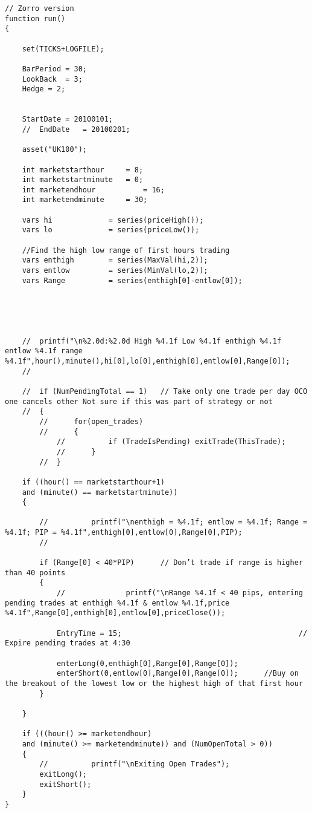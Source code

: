 \begin{lstlisting}[caption=First Hour Breakout System]
// Zorro version
function run()
{
	
	set(TICKS+LOGFILE);
	
	BarPeriod = 30;
	LookBack  = 3;
	Hedge = 2;
	
	
	StartDate = 20100101;
	//	EndDate   = 20100201;
	
	asset("UK100");
	
	int marketstarthour		= 8;
	int marketstartminute	= 0;
	int marketendhour			= 16;
	int marketendminute		= 30;
	
	vars hi				= series(priceHigh());
	vars lo				= series(priceLow());
	
	//Find the high low range of first hours trading
	vars enthigh		= series(MaxVal(hi,2)); 
	vars entlow 		= series(MinVal(lo,2));
	vars Range			= series(enthigh[0]-entlow[0]);
	
	
	
	
	
	//	printf("\n%2.0d:%2.0d High %4.1f Low %4.1f enthigh %4.1f entlow %4.1f range %4.1f",hour(),minute(),hi[0],lo[0],enthigh[0],entlow[0],Range[0]);
	//	
	
	//	if (NumPendingTotal == 1)   // Take only one trade per day OCO one cancels other Not sure if this was part of strategy or not
	//	{
		//		for(open_trades)
		//		{
			//			if (TradeIsPending) exitTrade(ThisTrade);
			//		}
		//	} 
	
	if ((hour() == marketstarthour+1)
	and (minute() == marketstartminute))
	{
		
		//			printf("\nenthigh = %4.1f; entlow = %4.1f; Range = %4.1f; PIP = %4.1f",enthigh[0],entlow[0],Range[0],PIP);
		//			
		
		if (Range[0] < 40*PIP) 		// Don’t trade if range is higher than 40 points
		{
			//				printf("\nRange %4.1f < 40 pips, entering pending trades at enthigh %4.1f & entlow %4.1f,price %4.1f",Range[0],enthigh[0],entlow[0],priceClose());
			
			EntryTime = 15;											// Expire pending trades at 4:30
			
			enterLong(0,enthigh[0],Range[0],Range[0]);
			enterShort(0,entlow[0],Range[0],Range[0]);		//Buy on the breakout of the lowest low or the highest high of that first hour
		}
		
	}
	
	if (((hour() >= marketendhour)
	and (minute() >= marketendminute)) and (NumOpenTotal > 0))
	{
		//			printf("\nExiting Open Trades");
		exitLong();
		exitShort();
	}
}
\end{lstlisting}

